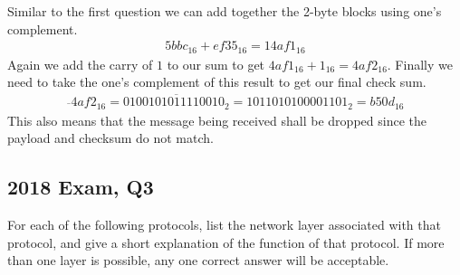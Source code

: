 \documentclass{article}
\begin{document}
Similar to the first question we can add together the 2-byte blocks using one's complement.
\begin{align*}
    5bbc_{16} + ef35_{16} = 14af1_{16}
\end{align*}
Again we add the carry of $1$ to our sum to get $4af1_{16} + 1_{16} = 4af2_{16}$. Finally we need to take the one's complement of this result to get our final check sum.
\begin{align*}
    \overline{}{4af2_{16}} = \overline{0100101011110010_{2}} = 1011010100001101_{2} = b50d_{16}
\end{align*}
This also means that the message being received shall be dropped since the payload and checksum do not match.

\subsection*{2018 Exam, Q3}
For each of the following protocols, list the network layer associated with that
protocol, and give a short explanation of the function of that protocol.
If more than one layer is possible, any one correct answer will be acceptable.
\end{document}
